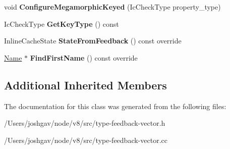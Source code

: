 \begin{DoxyCompactItemize}
\item 
void {\bfseries Configure\+Megamorphic\+Keyed} (Ic\+Check\+Type property\+\_\+type)\hypertarget{classv8_1_1internal_1_1_keyed_load_i_c_nexus_a86551cab50dda1685097525db2d0eefc}{}\label{classv8_1_1internal_1_1_keyed_load_i_c_nexus_a86551cab50dda1685097525db2d0eefc}

\item 
Ic\+Check\+Type {\bfseries Get\+Key\+Type} () const \hypertarget{classv8_1_1internal_1_1_keyed_load_i_c_nexus_aebc93f530e8b3902d1bc418834c5c1a4}{}\label{classv8_1_1internal_1_1_keyed_load_i_c_nexus_aebc93f530e8b3902d1bc418834c5c1a4}

\item 
Inline\+Cache\+State {\bfseries State\+From\+Feedback} () const  override\hypertarget{classv8_1_1internal_1_1_keyed_load_i_c_nexus_a1e2b975728a3d83ad3e2a2cfbdc8e60f}{}\label{classv8_1_1internal_1_1_keyed_load_i_c_nexus_a1e2b975728a3d83ad3e2a2cfbdc8e60f}

\item 
\hyperlink{classv8_1_1internal_1_1_name}{Name} $\ast$ {\bfseries Find\+First\+Name} () const  override\hypertarget{classv8_1_1internal_1_1_keyed_load_i_c_nexus_a5709fedc50c9f12001e23aa65fbbfa7e}{}\label{classv8_1_1internal_1_1_keyed_load_i_c_nexus_a5709fedc50c9f12001e23aa65fbbfa7e}

\end{DoxyCompactItemize}
\subsection*{Additional Inherited Members}


The documentation for this class was generated from the following files\+:\begin{DoxyCompactItemize}
\item 
/\+Users/joshgav/node/v8/src/type-\/feedback-\/vector.\+h\item 
/\+Users/joshgav/node/v8/src/type-\/feedback-\/vector.\+cc\end{DoxyCompactItemize}
